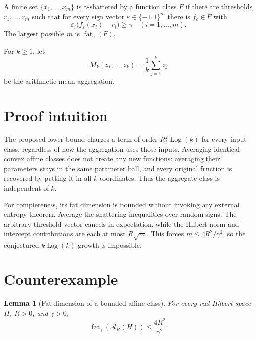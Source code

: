 \documentclass[11pt]{article}
\newtheorem{lemma}{Lemma}
\newcommand{\fat}{\operatorname{fat}}
\newcommand{\Log}{\operatorname{Log}}
\newcommand{\A}{\mathcal A}
\begin{document}
A finite set \(\{x_1,\ldots,x_m\}\) is \(\gamma\)-shattered by a function
class \(F\) if there are thresholds \(r_1,\ldots,r_m\) such that for every
sign vector \(\varepsilon\in\{-1,1\}^m\) there is \(f_\varepsilon\in F\)
with
\[
 \varepsilon_i\bigl(f_\varepsilon(x_i)-r_i\bigr)\geq\gamma
 \quad (i=1,\ldots,m).
\]
The largest possible \(m\) is \(\fat_\gamma(F)\).

For \(k\geq1\), let
\[
 M_k(z_1,\ldots,z_k)=\frac1k\sum_{j=1}^k z_j
\]
be the arithmetic-mean aggregation.

\section{Proof intuition}

The proposed lower bound charges a term of order \(R_i^2\Log(k)\) for every
input class, regardless of how the aggregation uses those inputs.  Averaging
identical convex affine classes does not create any new functions: averaging
their parameters stays in the same parameter ball, and every original
function is recovered by putting it in all \(k\) coordinates.  Thus the
aggregate class is independent of \(k\).

For completeness, its fat dimension is bounded without invoking any external
entropy theorem.  Average the shattering inequalities over random signs.
The arbitrary threshold vector cancels in expectation, while the Hilbert
norm and intercept contributions are each at most \(R\sqrt m\).  This forces
\(m\leq4R^2/\gamma^2\), so the conjectured \(k\Log(k)\) growth is impossible.

\section{Counterexample}

\begin{lemma}[Fat dimension of a bounded affine class]
\label{lem:fat}
For every real Hilbert space \(H\), \(R>0\), and \(\gamma>0\),
\[
 \fat_\gamma(\A_R(H))\leq \frac{4R^2}{\gamma^2}.
\]
\end{lemma}
\end{document}
